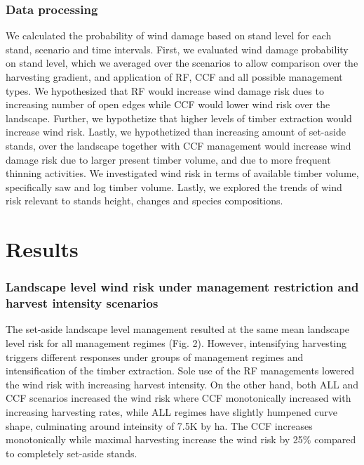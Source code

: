 \documentclass[]{elsarticle} %
\begin{document}
\subsubsection{Data processing}\label{data-processing}

We calculated the probability of wind damage based on stand level for
each stand, scenario and time intervals. First, we evaluated wind damage
probability on stand level, which we averaged over the scenarios to
allow comparison over the harvesting gradient, and application of RF,
CCF and all possible management types. We hypothesized that RF would
increase wind damage risk dues to increasing number of open edges while
CCF would lower wind risk over the landscape. Further, we hypothetize
that higher levels of timber extraction would increase wind risk.
Lastly, we hypothetized than increasing amount of set-aside stands, over
the landscape together with CCF management would increase wind damage
risk due to larger present timber volume, and due to more frequent
thinning activities. We investigated wind risk in terms of available
timber volume, specifically saw and log timber volume. Lastly, we
explored the trends of wind risk relevant to stands height, changes and
species compositions.

\section{Results}\label{results}

\subsubsection{Landscape level wind risk under management restriction
and harvest intensity
scenarios}\label{landscape-level-wind-risk-under-management-restriction-and-harvest-intensity-scenarios}

The set-aside landscape level management resulted at the same mean
landscape level risk for all management regimes (Fig. 2). However,
intensifying harvesting triggers different responses under groups of
management regimes and intensification of the timber extraction. Sole
use of the RF managements lowered the wind risk with increasing harvest
intensity. On the other hand, both ALL and CCF scenarios increased the
wind risk where CCF monotonically increased with increasing harvesting
rates, while ALL regimes have slightly humpened curve shape, culminating
around inteinsity of 7.5K by ha. The CCF increases monotonically while
maximal harvesting increase the wind risk by 25\% compared to completely
set-aside stands.
\end{document}
